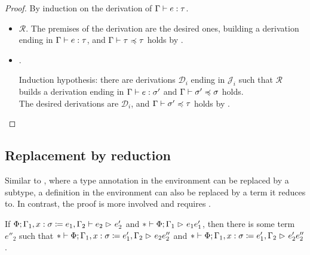 \begin{proof}
By induction on the derivation of $\type{\Gamma}{e}{\tau}$.
\begin{itemize}[noitemsep, label=\textbf{Case}, leftmargin=*, labelindent=\parindent]
  \item $\mathcal{R}$. The premises of the derivation are the desired ones,
    building a derivation ending in $\type{\Gamma}{e}{\tau}$,
    and $\subtype{\Gamma}{\tau}{\tau}$ holds by
    .
  \item {}.
    \vspace{-\baselineskip}
    \begin{mathpar}
    \end{mathpar}
    Induction hypothesis: there are derivations $\mathcal{D}_i$ ending in $\mathcal{J}_i$
    such that $\mathcal{R}$ builds a derivation ending in $\type{\Gamma}{e}{\sigma'}$
    and $\subtype{\Gamma}{\sigma'}{\sigma}$ holds. \\
    The desired derivations are $\mathcal{D}_i$, and $\subtype{\Gamma}{\sigma'}{\tau}$
    holds by . \qedhere
\end{itemize}
\end{proof}

\subsection{Replacement by reduction}

Similar to ,
where a type annotation in the environment can be replaced by a subtype,
a definition in the environment can also be replaced by a term it reduces to.
In contrast, the proof is more involved and requires .

\begin{lemma} \label{lem:replacement-reduction-1}
If $\red{\Phi; \Gamma_1, \define{x}{\sigma}{e_1}, \Gamma_2}{e_2}{e'_2}$
and $\red*{\Phi; \Gamma_1}{e_1}{e'_1}$,
then there is some term $e''_2$
such that $\red*{\Phi; \Gamma_1, \define{x}{\sigma}{e'_1}, \Gamma_2}{e_2}{e''_2}$
and $\red*{\Phi; \Gamma_1, \define{x}{\sigma}{e'_1}, \Gamma_2}{e'_2}{e''_2}$.
\end{lemma}

